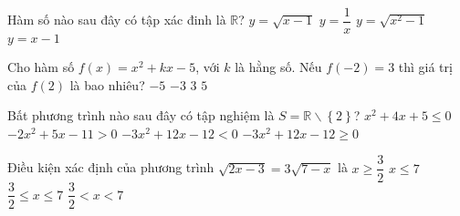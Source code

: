 \begin{ex}%
	Hàm số nào sau đây có tập xác đinh là $\mathbb{R}$?
	\choice
	{$y = \sqrt{x-1}$}
	{$y = \dfrac{1}{x}$}
	{$y = \sqrt{x^2-1}$}
	{\True $y = x - 1$}
\end{ex}  
\begin{ex}%
	Cho hàm số $f(x) = x^2 +kx - 5$, với $k$ là hằng số. Nếu $f(-2)=3$ thì giá trị của $f(2)$ là bao nhiêu?
	\choice
	{\True $-5$}
	{$-3$}
	{$3$}
	{$5$}
\end{ex} 
\begin{ex}%
	Bất phương trình nào sau đây có tập nghiệm là $S= \mathbb{R} \backslash \left\{ 2 \right\}$?
	\choice
	{$x^2+4x+5 \le 0$}
	{$-2 x^2 +5x-11 >0$}
	{\True $-3 x^2 +12x-12<0$}
	{$-3 x^2 +12x-12 \ge 0$}
\end{ex} 
\begin{ex}%
	Điều kiện xác định của phương trình $\sqrt{2x-3}=3\sqrt{7-x}$ là
	\choice
	{$x \ge \dfrac{3}{2}$}
	{$x \le 7$}
	{\True $\dfrac{3}{2} \le x \le 7$}
	{$\dfrac{3}{2} < x < 7$}
\end{ex}
